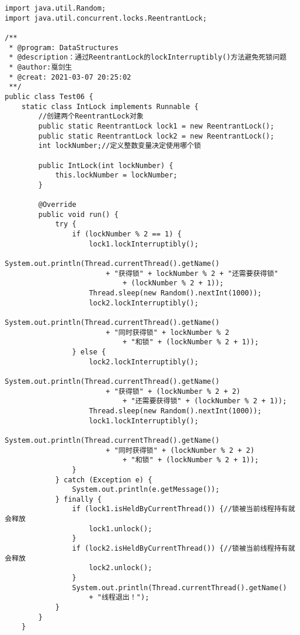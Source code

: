 \documentclass[a4paper]{report}
\begin{document}
\begin{Verbatim}[frame=single,numbersep=5pt,xleftmargin=1.5em,xrightmargin=1.5em]
import java.util.Random;
import java.util.concurrent.locks.ReentrantLock;

/**
 * @program: DataStructures
 * @description：通过ReentrantLock的lockInterruptibly()方法避免死锁问题
 * @author:戛剑生
 * @creat: 2021-03-07 20:25:02
 **/
public class Test06 {
    static class IntLock implements Runnable {
        //创建两个ReentrantLock对象
        public static ReentrantLock lock1 = new ReentrantLock();
        public static ReentrantLock lock2 = new ReentrantLock();
        int lockNumber;//定义整数变量决定使用哪个锁

        public IntLock(int lockNumber) {
            this.lockNumber = lockNumber;
        }

        @Override
        public void run() {
            try {
                if (lockNumber % 2 == 1) {
                    lock1.lockInterruptibly();
                    System.out.println(Thread.currentThread().getName() 
                        + "获得锁" + lockNumber % 2 + "还需要获得锁" 
                            + (lockNumber % 2 + 1));
                    Thread.sleep(new Random().nextInt(1000));
                    lock2.lockInterruptibly();
                    System.out.println(Thread.currentThread().getName() 
                        + "同时获得锁" + lockNumber % 2 
                            + "和锁" + (lockNumber % 2 + 1));
                } else {
                    lock2.lockInterruptibly();
                    System.out.println(Thread.currentThread().getName() 
                        + "获得锁" + (lockNumber % 2 + 2) 
                            + "还需要获得锁" + (lockNumber % 2 + 1));
                    Thread.sleep(new Random().nextInt(1000));
                    lock1.lockInterruptibly();
                    System.out.println(Thread.currentThread().getName() 
                        + "同时获得锁" + (lockNumber % 2 + 2) 
                            + "和锁" + (lockNumber % 2 + 1));
                }
            } catch (Exception e) {
                System.out.println(e.getMessage());
            } finally {
                if (lock1.isHeldByCurrentThread()) {//锁被当前线程持有就会释放
                    lock1.unlock();
                }
                if (lock2.isHeldByCurrentThread()) {//锁被当前线程持有就会释放
                    lock2.unlock();
                }
                System.out.println(Thread.currentThread().getName() 
                    + "线程退出！");
            }
        }
    }


\end{Verbatim}
\end{document}

